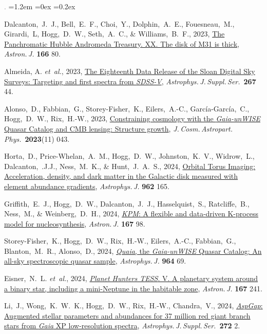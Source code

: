 \documentclass[10pt,letterpaper]{article}
\newcommand{\foreign}[1]{\textsl{#1}}
\newcommand{\etal}{\foreign{et~al.}}
\newcommand{\project}[1]{\textsl{#1}}
\newcommand{\doi}[2]{\href{http://dx.doi.org/#1}{{#2}}}
\newcommand{\deemph}[1]{\textcolor{grey}{\footnotesize{#1}}}
\newcommand{\pubnumber}[1]{\deemph{{#1}.}}
\newcounter{refpubnum}
\newcommand{\hogglist}{%
    \rightmargin=0in
    \leftmargin=1.2em
    \topsep=0ex
    \partopsep=0pt
    \itemsep=0.2ex
    \parsep=0pt
    \itemindent=-1.0\leftmargin
    \listparindent=0.0\leftmargin
    \settowidth{\labelsep}{~}
    \usecounter{refpubnum}
  }
\begin{document}
\begin{list}{\pubnumber{\therefpubnum}}{\hogglist}
\item
  Dalcanton,~J.~J., Bell,~E.~F., Choi,~Y., Dolphin,~A.~E., Fouesneau,~M., Girardi,~L,
  Hogg,~D.~W., Seth,~A.~C., \& Williams,~B.~F., 2023,
  \doi{10.3847/1538-3881/accc83}{The Panchromatic Hubble Andromeda Treasury. XX. The disk of M31 is thick},
  \textit{Astron.\,J.} \textbf{166} 80.
\item
  Almeida, A. \etal, 2023,
  \doi{10.3847/1538-4365/acda98}{The Eighteenth Data Release of the Sloan Digital Sky Surveys: Targeting and first spectra from \project{SDSS-V}},
  \textit{Astrophys.\,J.\,Suppl.\,Ser.}\ \textbf{267} 44.
\item
  Alonso,~D., Fabbian,~G., Storey-Fisher,~K., Eilers,~A.-C., Garc\'ia-Garc\'ia,~C.,
  Hogg,~D.~W., Rix,~H.-W., 2023,
  \doi{10.1088/1475-7516/2023/11/043}{Constraining cosmology with the \project{Gaia-unWISE} Quasar Catalog and CMB lensing: Structure growth},
  \textit{J.\,Cosm.\,Astropart.\,Phys.}\ \textbf{2023}(11) 043.
\item
  Horta,~D., Price-Whelan,~A.~M., Hogg,~D.~W., Johnston,~K.~V., Widrow,~L., Dalcanton,~.J.J., Ness,~M.~K.,
  \& Hunt,~J.~A.~S., 2024,
  \doi{10.3847/1538-4357/ad16e8}{Orbital Torus Imaging: Acceleration, density, and dark matter in the Galactic disk measured with element abundance gradients},
  \textit{Astrophys.\,J.} \textbf{962} 165.
\item
  Griffith,~E.~J., Hogg,~D.~W., Dalcanton,~J.~J., Hasselquist,~S., Ratcliffe,~B., Ness,~M., \& Weinberg,~D.~H., 2024,
  \doi{10.3847/1538-3881/ad19c7}{\project{KPM}: A flexible and data-driven K-process model for nucleosynthesis},
  \textit{Astron.\,J.} \textbf{167} 98.
\item
  Storey-Fisher,~K., Hogg,~D.~W., Rix,~H.-W., Eilers,~A.-C., Fabbian,~G., Blanton,~M.~R., Alonso,~D., 2024,
  \doi{10.3847/1538-4357/ad1328}{\project{Quaia}, the \project{Gaia-unWISE} Quasar Catalog: An all-sky spectroscopic quasar sample},
  \textit{Astrophys.\,J.} \textbf{964} 69.
\item
  Eisner,~N.~L. \etal, 2024,
  \doi{10.3847/1538-3881/ad1d5c}{\project{Planet Hunters TESS}. V. A planetary system around a binary star, including a mini-Neptune in the habitable zone},
  \textit{Astron.\,J.} \textbf{167} 241.
\item
  Li,~J., Wong,~K.~W.~K., Hogg,~D.~W., Rix,~H.-W., Chandra,~V., 2024,
  \doi{10.3847/1538-4365/ad2b4d}{\project{AspGap}: Augmented stellar parameters and abundances for 37 million red giant branch stars from \project{Gaia} XP low-resolution spectra},
  \textit{Astrophys.\,J.\,Suppl.\,Ser.}\ \textbf{272} 2.  

\end{list}
\end{document}
